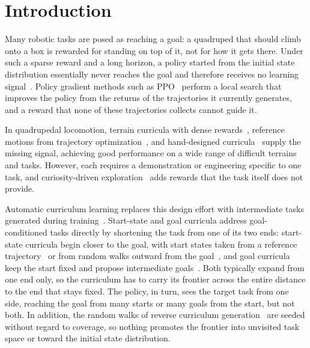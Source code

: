 \section{Introduction}\label{sec:introduction}

Many robotic tasks are posed as reaching a goal: a quadruped that should climb onto a box is rewarded for standing on top of it, not for how it gets there. Under such a sparse reward and a long horizon, a policy started from the initial state distribution essentially never reaches the goal and therefore receives no learning signal~\citep{florensa2017reverse}. Policy gradient methods such as PPO~\citep{schulman2017proximal} perform a local search that improves the policy from the returns of the trajectories it currently generates, and a reward that none of these trajectories collects cannot guide it.

In quadrupedal locomotion, terrain curricula with dense rewards~\citep{rudin2022learning, lee2020learning}, reference motions from trajectory optimization~\citep{fuchioka2023opt}, and hand-designed curricula~\citep{atanassov2024curriculum} supply the missing signal, achieving good performance on a wide range of difficult terrains and tasks. However, each requires a demonstration or engineering specific to one task, and curiosity-driven exploration~\citep{schwarke2023curiosity} adds rewards that the task itself does not provide.

Automatic curriculum learning replaces this design effort with intermediate tasks generated during training~\citep{narvekar2020curriculum, portelas2020automatic}. Start-state and goal curricula address goal-conditioned tasks directly by shortening the task from one of its two ends: start-state curricula begin closer to the goal, with start states taken from a reference trajectory~\citep{peng2018deepmimic, resnick2018backplay} or from random walks outward from the goal~\citep{florensa2017reverse}, and goal curricula keep the start fixed and propose intermediate goals~\citep{florensa2018automatic, ren2019exploration, cho2023outcome}. Both typically expand from one end only, so the curriculum has to carry its frontier across the entire distance to the end that stays fixed. The policy, in turn, sees the target task from one side, reaching the goal from many starts or many goals from the start, but not both. In addition, the random walks of reverse curriculum generation~\citep[RC;][]{florensa2017reverse} are seeded without regard to coverage, so nothing promotes the frontier into unvisited task space or toward the initial state distribution.

